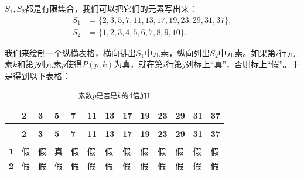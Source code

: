 \documentclass[12pt,UTF8,fontset=none]{ctexbook}
\begin{document}
$S_1,S_2$都是有限集合，我们可以把它们的元素写出来：
\begin{align*}
    S_1 &= \{2,3,5,7,11,13,17,19,23,29,31,37\},\\
    S_2 &= \{1,2,3,4,5,6,7,8,9,10\}.
\end{align*}

我们来绘制一个纵横表格，横向排出$S_1$中元素，纵向列出$S_2$中元素。如果第$i$行元素$k$和第$j$列元素$p$使得$P(p,k)$为真，就在第$i$行第$j$列标上“真”，否则标上“假”。于是得到以下表格：
\setlength{\tabcolsep}{2pt}%
\newlength{\colwidth}
\setlength{\colwidth}{\dimexpr(0.6\textwidth-2\tabcolsep*13)/13\relax}

{
\setlength{\abovecaptionskip}{-24pt}
\setlength{\belowcaptionskip}{12pt}
\renewcommand{\arraystretch}{0.8}
\footnotesize
\begin{longtable}{|>{\centering\arraybackslash}p{0.7cm}|*{12}{C|}}
\hline
 & \textbf{2} & \textbf{3} & \textbf{5} & \textbf{7} & \textbf{11} & \textbf{13} & \textbf{17} & \textbf{19} & \textbf{23} & \textbf{29} & \textbf{31} & \textbf{37} \\ \hline
\endfirsthead
\hline
 \\ \hline
{} & \textbf{2} & \textbf{3} & \textbf{5} & \textbf{7} & \textbf{11} & \textbf{13} & \textbf{17} & \textbf{19} & \textbf{23} & \textbf{29} & \textbf{31} & \textbf{37} \\ \hline
\endhead
\hline {} \\ \hline
\endfoot
\caption*{\texttt{素数$p$是否是$k$的$4$倍加$1$}}\label{tab:4-1}
\endlastfoot
\textbf{1} & 假 & 假 & 真 & 假 & 假 & 假 & 假 & 假 & 假 & 假 & 假 & 假 \\ \hline
\textbf{2} & 假 & 假 & 假 & 假 & 假 & 假 & 假 & 假 & 假 & 假 & 假 & 假 \\ \hline

\end{longtable}}
\end{document}
